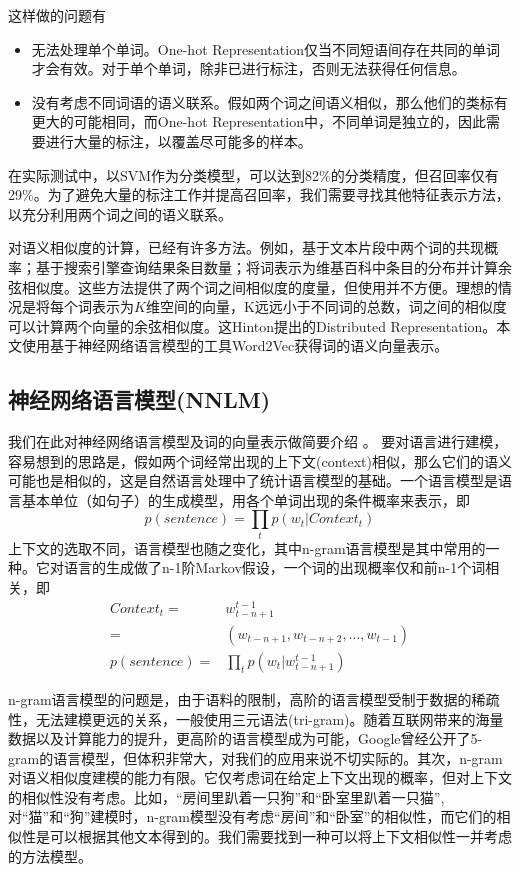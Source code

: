 这样做的问题有
\begin{itemize}
\item 无法处理单个单词。One-hot Representation仅当不同短语间存在共同的单词才会有效。对于单个单词，除非已进行标注，否则无法获得任何信息。
\item 没有考虑不同词语的语义联系。假如两个词之间语义相似，那么他们的类标有更大的可能相同，而One-hot Representation中，不同单词是独立的，因此需要进行大量的标注，以覆盖尽可能多的样本。
\end{itemize}
在实际测试中，以SVM作为分类模型，可以达到82\%的分类精度，但召回率仅有29\%。为了避免大量的标注工作并提高召回率，我们需要寻找其他特征表示方法，以充分利用两个词之间的语义联系。

对语义相似度的计算，已经有许多方法。例如，基于文本片段中两个词的共现概率\cite{jiang1997semantic}；基于搜索引擎查询结果条目数量\cite{bollegala2007measuring}；将词表示为维基百科中条目的分布并计算余弦相似度\cite{liu2009clustering}。这些方法提供了两个词之间相似度的度量，但使用并不方便。理想的情况是将每个词表示为$K$维空间的向量，K远远小于不同词的总数，词之间的相似度可以计算两个向量的余弦相似度。这Hinton提出的Distributed Representation\cite{hinton1986learning}。本文使用基于神经网络语言模型的工具Word2Vec获得词的语义向量表示。

\subsection{神经网络语言模型(NNLM)}
我们在此对神经网络语言模型及词的向量表示做简要介绍\cite{bengio2006neural} \cite{mikolov2013efficient}。 要对语言进行建模，容易想到的思路是，假如两个词经常出现的上下文(context)相似，那么它们的语义可能也是相似的，这是自然语言处理中了统计语言模型的基础。一个语言模型是语言基本单位（如句子）的生成模型，用各个单词出现的条件概率来表示，即
\[
p(sentence) = \prod\limits_t {p({w_t}|Context_t)}
\]
上下文的选取不同，语言模型也随之变化，其中n-gram语言模型是其中常用的一种。它对语言的生成做了n-1阶Markov假设，一个词的出现概率仅和前n-1个词相关，即
\begin{align*}
Context_t = & w_{t-n+1}^{t-1} \\
		= & (w_{t-n+1}, w_{t-n+2}, \ldots, w_{t-1}) \\
p(sentence) = & \prod\limits_t {p({w_t}|w_{t-n+1}^{t-1})}
\end{align*}

n-gram语言模型的问题是，由于语料的限制，高阶的语言模型受制于数据的稀疏性，无法建模更远的关系，一般使用三元语法(tri-gram)。随着互联网带来的海量数据以及计算能力的提升，更高阶的语言模型成为可能，Google曾经公开了5-gram的语言模型，但体积非常大，对我们的应用来说不切实际的。其次，n-gram对语义相似度建模的能力有限。它仅考虑词在给定上下文出现的概率，但对上下文的相似性没有考虑。比如，``房间里趴着一只狗''和``卧室里趴着一只猫'',对``猫''和``狗''建模时，n-gram模型没有考虑``房间''和``卧室''的相似性，而它们的相似性是可以根据其他文本得到的。我们需要找到一种可以将上下文相似性一并考虑的方法模型。

